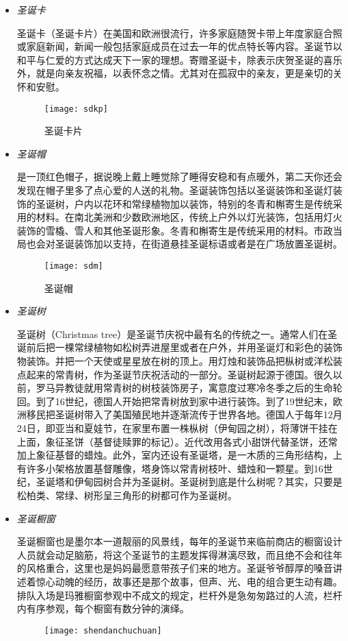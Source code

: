 \begin{itemize}
\item \emph{圣诞卡}

 圣诞卡（圣诞卡片）在美国和欧洲很流行，许多家庭随贺卡带上年度家庭合照或家庭新闻，新闻一般包括家庭成员在过去一年的优点特长等内容。圣诞节以和平与仁爱的方式达成天下一家的理想。寄赠圣诞卡，除表示庆贺圣诞的喜乐外，就是向亲友祝福，以表怀念之情。尤其对在孤寂中的亲友，更是亲切的关怀和安慰。

 \begin{figure}[htb]
    \centering
    \texttt{[image: sdkp]}
    \caption{圣诞卡片}
 \end{figure}

\item \emph{圣诞帽}

 是一顶红色帽子，据说晚上戴上睡觉除了睡得安稳和有点暖外，第二天你还会发现在帽子里多了点心爱的人送的礼物。圣诞装饰包括以圣诞装饰和圣诞灯装饰的圣诞树，户内以花环和常绿植物加以装饰，特别的冬青和槲寄生是传统采用的材料。在南北美洲和少数欧洲地区，传统上户外以灯光装饰，包括用灯火装饰的雪橇、雪人和其他圣诞形象。冬青和槲寄生是传统采用的材料。市政当局也会对圣诞装饰加以支持，在街道悬挂圣诞标语或者是在广场放置圣诞树。
 \begin{figure}[htb]
     \centering
     \texttt{[image: sdm]}
     \caption{圣诞帽}
 \end{figure}

\item \emph{圣诞树}

 圣诞树（Christmas tree）是圣诞节庆祝中最有名的传统之一。通常人们在圣诞前后把一棵常绿植物如松树弄进屋里或者在户外，并用圣诞灯和彩色的装饰物装饰。并把一个天使或星星放在树的顶上。用灯烛和装饰品把枞树或洋松装点起来的常青树，作为圣诞节庆祝活动的一部分。圣诞树起源于德国。很久以前，罗马异教徒就用常青树的树枝装饰房子，寓意度过寒冷冬季之后的生命轮回。到了16世纪，德国人开始把常青树放到家中进行装饰。到了19世纪末，欧洲移民把圣诞树带入了美国殖民地并逐渐流传于世界各地。德国人于每年12月24日，即亚当和夏娃节，在家里布置一株枞树（伊甸园之树），将薄饼干挂在上面，象征圣饼（基督徒赎罪的标记）。近代改用各式小甜饼代替圣饼，还常加上象征基督的蜡烛。此外，室内还设有圣诞塔，是一木质的三角形结构，上有许多小架格放置基督雕像，塔身饰以常青树枝叶、蜡烛和一颗星。到16世纪，圣诞塔和伊甸园树合并为圣诞树。圣诞树到底是什么树呢？其实，只要是松柏类、常绿、树形呈三角形的树都可作为圣诞树。

\item \emph{圣诞橱窗}

 圣诞橱窗也是墨尔本一道靓丽的风景线，每年的圣诞节来临前商店的橱窗设计人员就会动足脑筋，将这个圣诞节的主题发挥得淋漓尽致，而且绝不会和往年的风格重合，这里也是妈妈最愿意带孩子们来的地方。圣诞爷爷醇厚的嗓音讲述着惊心动魄的经历，故事还是那个故事，但声、光、电的组合更生动有趣。排队入场是玛雅橱窗参观中不成文的规定，栏杆外是急匆匆路过的人流，栏杆内有序参观，每个橱窗有数分钟的演绎。
\begin{figure}[htb]
    \centering
    \texttt{[image: shendanchuchuan]}


\end{figure}
\end{itemize}
